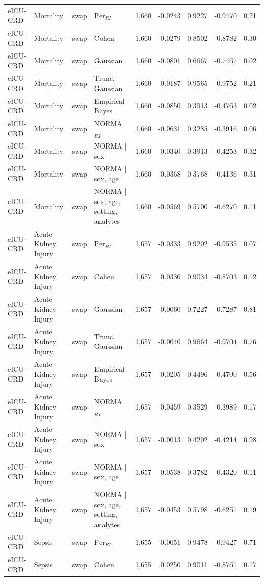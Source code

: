\begin{table}[ht]
\begin{tabular}{ll l l r r r r r}
eICU-CRD & Mortality & swap & Per$_{RI}$ & 1,660 & -0.0243 & 0.9227 & -0.9470 & 0.21 \\
eICU-CRD & Mortality & swap & Cohen & 1,660 & -0.0279 & 0.8502 & -0.8782 & 0.30 \\
eICU-CRD & Mortality & swap & Gaussian & 1,660 & -0.0801 & 0.6667 & -0.7467 & 0.02 \\
eICU-CRD & Mortality & swap & Trunc. Gaussian & 1,660 & -0.0187 & 0.9565 & -0.9752 & 0.21 \\
eICU-CRD & Mortality & swap & Empirical Bayes & 1,660 & -0.0850 & 0.3913 & -0.4763 & 0.02 \\
eICU-CRD & Mortality & swap & NORMA$_{RI}$ & 1,660 & -0.0631 & 0.3285 & -0.3916 & 0.06 \\
eICU-CRD & Mortality & swap & NORMA | sex & 1,660 & -0.0340 & 0.3913 & -0.4253 & 0.32 \\
eICU-CRD & Mortality & swap & NORMA | sex, age & 1,660 & -0.0368 & 0.3768 & -0.4136 & 0.31 \\
eICU-CRD & Mortality & swap & NORMA | sex, age, setting, analytes & 1,660 & -0.0569 & 0.5700 & -0.6270 & 0.11 \\
eICU-CRD & Acute Kidney Injury & swap & Per$_{RI}$ & 1,657 & -0.0333 & 0.9202 & -0.9535 & 0.07 \\
eICU-CRD & Acute Kidney Injury & swap & Cohen & 1,657 & 0.0330 & 0.9034 & -0.8703 & 0.12 \\
eICU-CRD & Acute Kidney Injury & swap & Gaussian & 1,657 & -0.0060 & 0.7227 & -0.7287 & 0.81 \\
eICU-CRD & Acute Kidney Injury & swap & Trunc. Gaussian & 1,657 & -0.0040 & 0.9664 & -0.9704 & 0.76 \\
eICU-CRD & Acute Kidney Injury & swap & Empirical Bayes & 1,657 & -0.0205 & 0.4496 & -0.4700 & 0.56 \\
eICU-CRD & Acute Kidney Injury & swap & NORMA$_{RI}$ & 1,657 & -0.0459 & 0.3529 & -0.3989 & 0.17 \\
eICU-CRD & Acute Kidney Injury & swap & NORMA | sex & 1,657 & -0.0013 & 0.4202 & -0.4214 & 0.98 \\
eICU-CRD & Acute Kidney Injury & swap & NORMA | sex, age & 1,657 & -0.0538 & 0.3782 & -0.4320 & 0.11 \\
eICU-CRD & Acute Kidney Injury & swap & NORMA | sex, age, setting, analytes & 1,657 & -0.0453 & 0.5798 & -0.6251 & 0.19 \\
eICU-CRD & Sepsis & swap & Per$_{RI}$ & 1,655 & 0.0051 & 0.9478 & -0.9427 & 0.71 \\
eICU-CRD & Sepsis & swap & Cohen & 1,655 & 0.0250 & 0.9011 & -0.8761 & 0.17 \\

\end{tabular}
\end{table}
